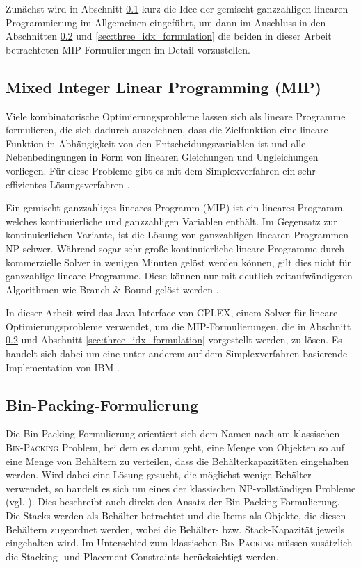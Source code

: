 Zunächst wird in Abschnitt \ref{sec:mip_definition} kurz die Idee der gemischt-ganzzahligen linearen Programmierung im Allgemeinen
eingeführt, um dann im Anschluss in den Abschnitten \ref{sec:bin_packing_formulation} und \ref{sec:three_idx_formulation} die beiden in dieser Arbeit betrachteten MIP-Formulierungen im Detail vorzustellen.

\subsection{Mixed Integer Linear Programming (MIP)}
\label{sec:mip_definition}

Viele kombinatorische Optimierungsprobleme lassen sich als lineare Programme formulieren, die sich dadurch
auszeichnen, dass die Zielfunktion eine lineare Funktion in Abhängigkeit von den Entscheidungsvariablen ist
und alle Nebenbedingungen in Form von linearen Gleichungen und Ungleichungen vorliegen. Für diese Probleme gibt es mit dem Simplexverfahren ein sehr effizientes Lösungsverfahren \cite{Knust2017}.

Ein gemischt-ganzzahliges lineares Programm (MIP) ist ein lineares Programm, welches kontinuierliche und ganzzahligen Variablen
enthält. Im Gegensatz zur kontinuierlichen Variante, ist die Lösung von ganzzahligen linearen Programmen NP-schwer.
Während sogar sehr große kontinuierliche lineare Programme durch kommerzielle Solver in wenigen Minuten gelöst werden können, gilt dies nicht für ganzzahlige lineare Programme. Diese können nur mit deutlich zeitaufwändigeren Algorithmen wie Branch \& Bound gelöst werden \cite{Brucker2006}.

In dieser Arbeit wird das Java-Interface von CPLEX, einem Solver für lineare Optimierungsprobleme verwendet,
um die MIP-Formulierungen, die in Abschnitt \ref{sec:bin_packing_formulation} und Abschnitt \ref{sec:three_idx_formulation} vorgestellt werden,
zu lösen. Es handelt sich dabei um eine unter anderem auf dem Simplexverfahren basierende Implementation von IBM \cite{CPLEX2015}.

\subsection{Bin-Packing-Formulierung}
\label{sec:bin_packing_formulation}

Die Bin-Packing-Formulierung orientiert sich dem Namen nach am klassischen \textsc{Bin-Packing} Problem, bei dem es darum geht,
eine Menge von Objekten so auf eine Menge von Behältern zu verteilen, dass die Behälterkapazitäten eingehalten werden.
Wird dabei eine Lösung gesucht, die möglichst wenige Behälter verwendet, so handelt es sich um eines der klassischen NP-vollständigen
Probleme (vgl. \citet{Garey1979}).
Dies beschreibt auch direkt den Ansatz der Bin-Packing-Formulierung. Die Stacks werden als Behälter betrachtet und die Items als Objekte,
die diesen Behältern zugeordnet werden, wobei die Behälter- bzw. Stack-Kapazität jeweils eingehalten wird. Im Unterschied zum klassischen \textsc{Bin-Packing} müssen zusätzlich die Stacking- und Placement-Constraints berücksichtigt werden.

